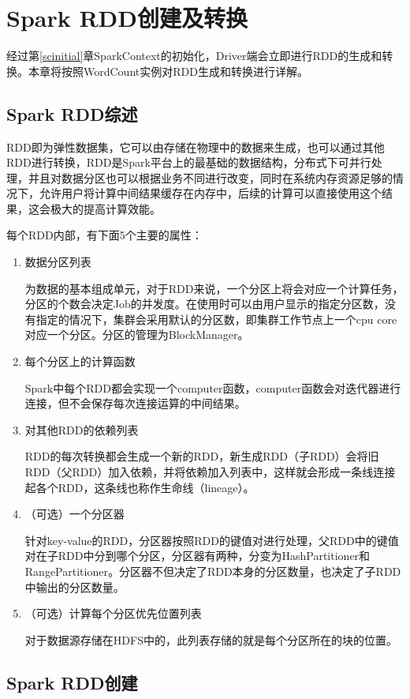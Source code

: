 \chapter{Spark RDD创建及转换}
\label{chap:rddcreate}
经过第\ref{scinitial}章SparkContext的初始化，Driver端会立即进行RDD的生成和转换。本章将按照WordCount实例对RDD生成和转换进行详解。
\section{Spark RDD综述}

RDD即为弹性数据集，它可以由存储在物理中的数据来生成，也可以通过其他RDD进行转换，RDD是Spark平台上的最基础的数据结构，分布式下可并行处理，并且对数据分区也可以根据业务不同进行改变，同时在系统内存资源足够的情况下，允许用户将计算中间结果缓存在内存中，后续的计算可以直接使用这个结果，这会极大的提高计算效能。

每个RDD内部，有下面5个主要的属性：

\begin{enumerate}[\bfseries 1]
	\item 数据分区列表
	
	为数据的基本组成单元，对于RDD来说，一个分区上将会对应一个计算任务，分区的个数会决定Job的并发度。在使用时可以由用户显示的指定分区数，没有指定的情况下，集群会采用默认的分区数，即集群工作节点上一个cpu core对应一个分区。分区的管理为BlockManager。
	\item 每个分区上的计算函数
	
	Spark中每个RDD都会实现一个computer函数，computer函数会对迭代器进行连接，但不会保存每次连接运算的中间结果。
	\item 对其他RDD的依赖列表
	
	RDD的每次转换都会生成一个新的RDD，新生成RDD（子RDD）会将旧RDD（父RDD）加入依赖，并将依赖加入列表中，这样就会形成一条线连接起各个RDD，这条线也称作生命线（lineage）。
	\item （可选）一个分区器
	
	针对key-value的RDD，分区器按照RDD的键值对进行处理，父RDD中的键值对在子RDD中分到哪个分区，分区器有两种，分变为HashPartitioner和RangePartitioner。分区器不但决定了RDD本身的分区数量，也决定了子RDD中输出的分区数量。
	\item （可选）计算每个分区优先位置列表
	
	对于数据源存储在HDFS中的，此列表存储的就是每个分区所在的块的位置。
\end{enumerate}
\section{Spark RDD创建}

